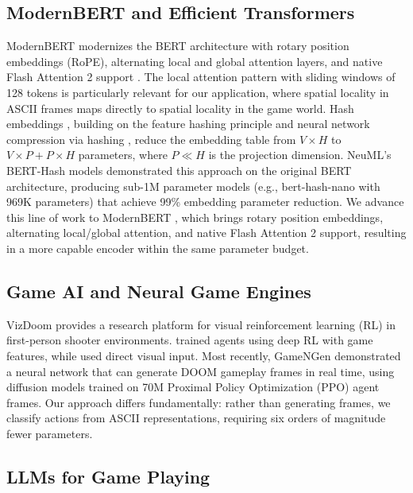\documentclass[11pt,a4paper]{article}
\begin{document}
\subsection{ModernBERT and Efficient Transformers}

ModernBERT \citep{modernbert2024} modernizes the BERT architecture with rotary position embeddings (RoPE), alternating local and global attention layers, and native Flash Attention 2 support \citep{dao2023flashattention2}. The local attention pattern with sliding windows of 128 tokens is particularly relevant for our application, where spatial locality in ASCII frames maps directly to spatial locality in the game world. Hash embeddings \citep{svenstrup2017hash}, building on the feature hashing principle \citep{weinberger2009feature} and neural network compression via hashing \citep{chen2015hashing}, reduce the embedding table from $V \times H$ to $V \times P + P \times H$ parameters, where $P \ll H$ is the projection dimension. NeuML's BERT-Hash models \citep{neuml2025berthash} demonstrated this approach on the original BERT architecture, producing sub-1M parameter models (e.g., bert-hash-nano with 969K parameters) that achieve 99\% embedding parameter reduction. We advance this line of work to ModernBERT \citep{modernbert2024}, which brings rotary position embeddings, alternating local/global attention, and native Flash Attention 2 support, resulting in a more capable encoder within the same parameter budget.

\subsection{Game AI and Neural Game Engines}

VizDoom \citep{wydmuch2019vizdoom} provides a research platform for visual reinforcement learning (RL) in first-person shooter environments. \citet{lample2017playing} trained agents using deep RL with game features, while \citet{dosovitskiy2017learning} used direct visual input. Most recently, GameNGen \citep{valevski2024gamengen} demonstrated a neural network that can generate DOOM gameplay frames in real time, using diffusion models trained on 70M Proximal Policy Optimization (PPO) agent frames. Our approach differs fundamentally: rather than generating frames, we classify actions from ASCII representations, requiring six orders of magnitude fewer parameters.

\subsection{LLMs for Game Playing}
\end{document}
